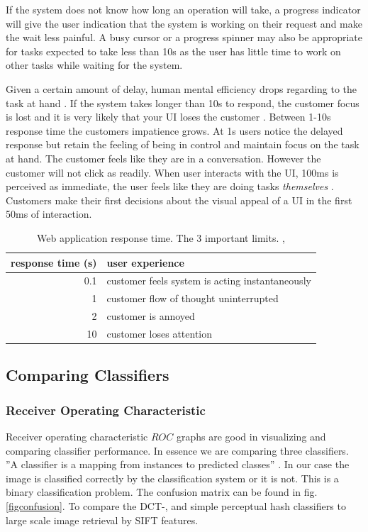 \documentclass[english,12pt,a4paper,pdftex,elec,utf8]{aaltothesis}
\begin{document}
If the system does not know how long an operation will take, a progress indicator will give the user indication that the system is working on their request and make the wait less painful. A busy cursor or a progress spinner may also be appropriate for tasks expected to take less than 10s as the user has little time to work on other tasks while waiting for the system. \cite{Nielsen1993a}

Given a certain amount of delay, human mental efficiency drops regarding to the task at hand \cite{Miller1968}. If the system takes longer than 10s to respond, the customer focus is lost and it is very likely that your UI loses the customer \cite{Nielsen1993a}. Between 1-10s response time the customers impatience grows. At 1s users notice the delayed response but retain the feeling of being in control and maintain focus on the task at hand. The customer feels like they are in a conversation. However the customer will not click as readily. When user interacts with the UI, 100ms is perceived as immediate, the user feels like they are doing tasks \emph{themselves} \cite{Nielsen2010}. Customers make their first decisions about the visual appeal of a UI in the first 50ms of interaction. \cite{Nielsen2010}

\def\arraystretch{1.5}
\begin{table}[htb]
\caption{Web application response time. The 3 important limits. \cite{Miller1968},\cite{Nielsen1993}}
\label{webresponsetimes}
\begin{center}
  \begin{tabular}{rl}
    \hline
  response time (s) & user experience\\
  \hline
  0.1 & customer feels system is acting instantaneously\\
  1 & customer flow of thought uninterrupted\\
  2 & customer is annoyed\\
  10 & customer loses attention\\
  \hline
\end{tabular}
\end{center}\end{table}

\subsection{Comparing Classifiers}
\subsubsection{Receiver Operating Characteristic}\label{ROCSection}
Receiver operating characteristic \(ROC\) graphs are good in visualizing and comparing classifier performance. In essence we are comparing three classifiers. ''A classifier is a mapping from instances to predicted classes'' \cite{Fawcett2006}. In our case the image is classified correctly by the classification system or it is not. This is a binary classification problem. The confusion matrix can be found in fig. \ref{figconfusion}. To compare the DCT-, and simple perceptual hash classifiers to large scale image retrieval by SIFT features.
\end{document}
